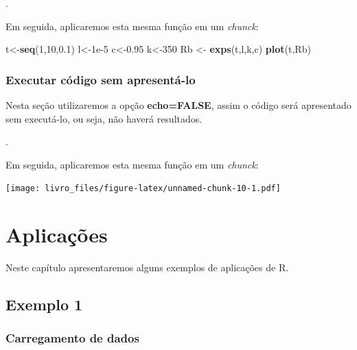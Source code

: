\documentclass[]{book}
\newenvironment{Shaded}{\begin{snugshade}}{\end{snugshade}}
\newcommand{\KeywordTok}[1]{\textcolor[rgb]{0.13,0.29,0.53}{\textbf{#1}}}
\newcommand{\DecValTok}[1]{\textcolor[rgb]{0.00,0.00,0.81}{#1}}
\newcommand{\FloatTok}[1]{\textcolor[rgb]{0.00,0.00,0.81}{#1}}
\newcommand{\StringTok}[1]{\textcolor[rgb]{0.31,0.60,0.02}{#1}}
\newcommand{\CommentTok}[1]{\textcolor[rgb]{0.56,0.35,0.01}{\textit{#1}}}
\newcommand{\NormalTok}[1]{#1}
\begin{document}
.

Em seguida, aplicaremos esta mesma função em um \emph{chunck}:

\begin{Shaded}
\begin{Highlighting}[]
\NormalTok{t<-}\KeywordTok{seq}\NormalTok{(}\DecValTok{1}\NormalTok{,}\DecValTok{10}\NormalTok{,}\FloatTok{0.1}\NormalTok{)}
\NormalTok{l<-}\FloatTok{1e-5}
\NormalTok{c<-}\FloatTok{0.95}
\NormalTok{k<-}\DecValTok{350}
\NormalTok{Rb <-}\StringTok{ }\KeywordTok{exps}\NormalTok{(t,l,k,c)}
\KeywordTok{plot}\NormalTok{(t,Rb)}
\end{Highlighting}
\end{Shaded}

\subsection{Executar código sem
apresentá-lo}\label{executar-cuxf3digo-sem-apresentuxe1-lo}

Nesta seção utilizaremos a opção \textbf{echo=FALSE}, assim o código
será apresentado sem executá-lo, ou seja, não haverá resultados.

.

Em seguida, aplicaremos esta mesma função em um \emph{chunck}:

\texttt{[image: livro\_files/figure-latex/unnamed-chunk-10-1.pdf]}

\chapter{Aplicações}\label{aplicauxe7uxf5es}

Neste capítulo apresentaremos alguns exemplos de aplicações de R.

\section{Exemplo 1}\label{exemplo-1}

\subsection{Carregamento de dados}\label{carregamento-de-dados}

\begin{Shaded}
\end{Shaded}
\end{document}
